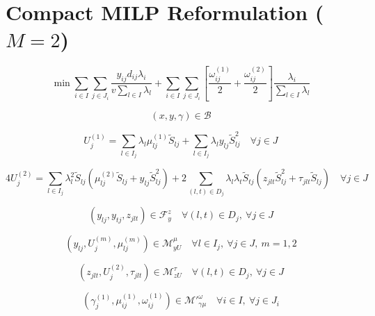 \documentclass{article}
\begin{document}
\section*{Compact MILP Reformulation ($M=2$)}
\begin{equation}
\min
\sum_{i \in I} \sum_{j \in J_i} \frac{y_{ij} d_{ij} \lambda_i}{v \sum_{l \in I} \lambda_l}
+
\sum_{i \in I} \sum_{j \in J_i}
\left[
\frac{\omega_{ij}^{(1)}}{2} + \frac{\omega_{ij}^{(2)}}{2}
\right]
\frac{\lambda_i}{\sum_{l \in I} \lambda_l}
\tag{13a}
\end{equation}

\begin{equation}
(x,y,\gamma) \in \mathcal B
\tag{13b}
\end{equation}

\begin{equation}
U_j^{(1)} =
\sum_{l \in I_j} \lambda_l \mu_{lj}^{(1)} \tilde S_{lj}
+
\sum_{l \in I_j} \lambda_l y_{lj} \tilde S_{lj}^{2}
\quad \forall j \in J
\tag{13c}
\end{equation}

\begin{equation}
4U_j^{(2)} =
\sum_{l \in I_j} \lambda_l^2 \tilde S_{lj}
\left(\mu_{lj}^{(2)} \tilde S_{lj} + y_{lj}\tilde S_{lj}^{2}\right)
+
2\sum_{(l,t)\in D_j}\lambda_l\lambda_t \tilde S_{tj}
\left(z_{jlt}\tilde S_{lj}^{2} + \tau_{jlt}\tilde S_{lj}\right)
\quad \forall j \in J
\tag{13d}
\end{equation}

\begin{equation}
(y_{lj}, y_{tj}, z_{jlt}) \in \mathcal F_y^z
\quad \forall (l,t)\in D_j,\ \forall j \in J
\tag{13e}
\end{equation}

\begin{equation}
(y_{lj}, U_j^{(m)}, \mu_{lj}^{(m)}) \in \mathcal M_{yU}^{\mu}
\quad \forall l \in I_j,\ \forall j \in J,\ m=1,2
\tag{13f}
\end{equation}

\begin{equation}
(z_{jlt}, U_j^{(2)}, \tau_{jlt}) \in \mathcal M_{zU}^{\tau}
\quad \forall (l,t)\in D_j,\ \forall j \in J
\tag{13g}
\end{equation}

\begin{equation}
(\gamma_j^{(1)}, \mu_{ij}^{(1)}, \omega_{ij}^{(1)}) \in {\mathcal M'}_{\gamma\mu}^{\omega}
\quad \forall i \in I,\ \forall j \in J_i
\tag{13h}
\end{equation}
\end{document}
